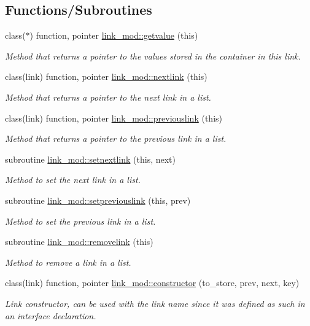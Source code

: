 \subsection*{Functions/\+Subroutines}
\begin{DoxyCompactItemize}
\item 
class($\ast$) function, pointer \mbox{\hyperlink{namespacelink__mod_aa2c8d19ee91797e19464fc7589cc2c39}{link\+\_\+mod\+::getvalue}} (this)
\begin{DoxyCompactList}\small\item\em Method that returns a pointer to the values stored in the container in this link. \end{DoxyCompactList}\item 
class(link) function, pointer \mbox{\hyperlink{namespacelink__mod_a2d776121ed0138aba8b3d166938c964f}{link\+\_\+mod\+::nextlink}} (this)
\begin{DoxyCompactList}\small\item\em Method that returns a pointer to the next link in a list. \end{DoxyCompactList}\item 
class(link) function, pointer \mbox{\hyperlink{namespacelink__mod_a2d23022ef22049f8340099b6960d8d5d}{link\+\_\+mod\+::previouslink}} (this)
\begin{DoxyCompactList}\small\item\em Method that returns a pointer to the previous link in a list. \end{DoxyCompactList}\item 
subroutine \mbox{\hyperlink{namespacelink__mod_a0dd2fe581e8d566faf03fc7ebd2f8524}{link\+\_\+mod\+::setnextlink}} (this, next)
\begin{DoxyCompactList}\small\item\em Method to set the next link in a list. \end{DoxyCompactList}\item 
subroutine \mbox{\hyperlink{namespacelink__mod_ad0d413cb7907fdcf6561639cdd03481a}{link\+\_\+mod\+::setpreviouslink}} (this, prev)
\begin{DoxyCompactList}\small\item\em Method to set the previous link in a list. \end{DoxyCompactList}\item 
subroutine \mbox{\hyperlink{namespacelink__mod_ae2d89f23eb8cf4b8065b8a39e9902a22}{link\+\_\+mod\+::removelink}} (this)
\begin{DoxyCompactList}\small\item\em Method to remove a link in a list. \end{DoxyCompactList}\item 
class(link) function, pointer \mbox{\hyperlink{namespacelink__mod_ac5b4f1702d8edb10a4559f6f371dc797}{link\+\_\+mod\+::constructor}} (to\+\_\+store, prev, next, key)
\begin{DoxyCompactList}\small\item\em Link constructor, can be used with the \textquotesingle{}link\textquotesingle{} name since it was defined as such in an interface declaration. \end{DoxyCompactList}\end{DoxyCompactItemize}
